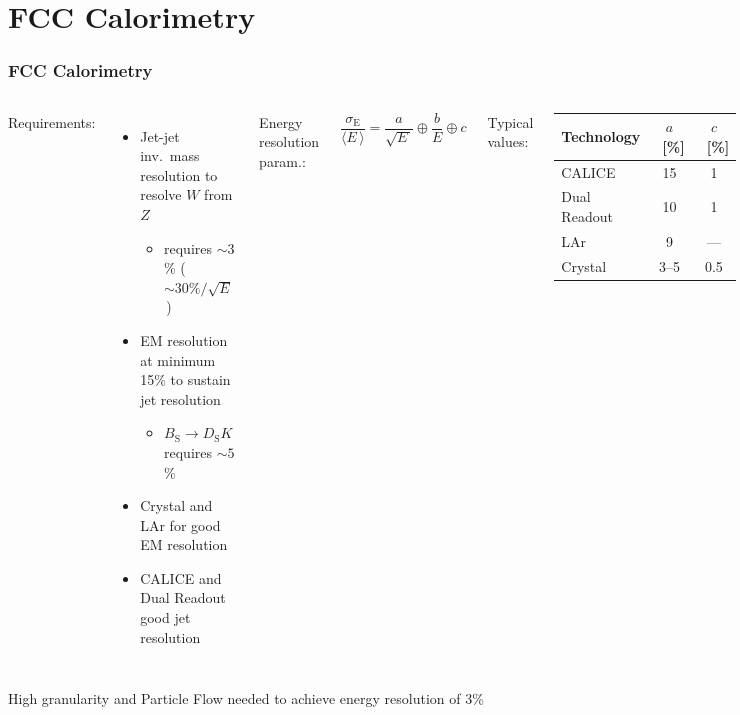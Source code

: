 \documentclass{beamer}
\newcommand{\bluetext}[1]{%
  \textcolor{myBlue}{#1}
}
\newcommand{\redtext}[1]{%
  \textcolor{myRed}{#1}
}
\begin{document}
\section{FCC Calorimetry}

\begin{frame}
  \frametitle{FCC Calorimetry}

  \vspace{2ex}
  \begin{columns}[c]
    \bluetext{Requirements:}
    \begin{itemize}
      \item Jet-jet inv.\ mass resolution to resolve $W$ from $Z$
            \begin{itemize}
              \item requires $\sim 3$\% ($\sim 30\% / \sqrt{E}$\,)
            \end{itemize}
      \item EM resolution at minimum 15\% to sustain jet resolution\\[-0.4ex]
            \begin{itemize}
              \item $B_\text{S} \rightarrow D_\text{S}K$ requires $\sim 5$\%
            \end{itemize}
      \item Crystal and LAr for good EM resolution
      \item CALICE and Dual Readout good jet resolution
    \end{itemize}

    \bluetext{Energy resolution param.:}
    \[ \frac{\sigma_\text{E}}{\langle E\,\rangle} = \frac{a}{\sqrt{E\,}} \oplus
                                                    \frac{b}{E} \oplus c \]

    \bluetext{Typical values:}
    \begin{center}
      \small
      \begin{tabular}{lcc}
        Technology   & $a$~[\%] & $c$~[\%] \\
        \midrule
        CALICE       & 15       & 1 \\
        Dual Readout & 10       & 1 \\
        LAr          & 9        & --- \\
        Crystal      & 3--5     & 0.5 \\
      \end{tabular}
    \end{center}
  \end{columns}

  \vspace{1ex}
  \redtext{High granularity and Particle Flow needed to achieve energy
           resolution of 3\%}
\end{frame}
\end{document}
